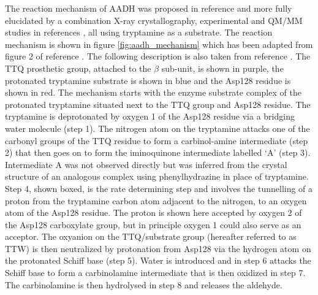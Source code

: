The reaction mechanism of AADH was proposed in reference \cite{hyunMechanisticStudiesAromatic1995a} and more fully elucidated by a combination X-ray crystallography, experimental and QM/MM studies in references \cite{masgrauAtomicDescriptionEnzyme2006,masgrauTunnelingClassicalPaths2007, ranaghanInitioQMMM2017}, all using tryptamine as a substrate. 
The reaction mechanism is shown in figure \ref{fig:aadh_mechanism} which has been adapted from figure 2 of reference \cite{masgrauAtomicDescriptionEnzyme2006}. The following description is also taken from reference \cite{masgrauAtomicDescriptionEnzyme2006}. The TTQ prosthetic group, attached to the $\beta$ sub-unit, is shown in purple, the protonated tryptamine substrate is shown in blue and the Asp128 residue is shown in red.  The mechanism starts with the enzyme substrate complex of the protonated tryptamine situated next to the TTQ group and Asp128 residue. The tryptamine is deprotonated by oxygen 1 of the Asp128 residue via a bridging water molecule (step 1). The nitrogen atom on the tryptamine attacks one of the carbonyl groups of the TTQ residue to form a carbinol-amine intermediate (step 2) that then goes on to form the iminoquinone intermediate labelled `A' (step 3). Intermediate A was not observed directly but was inferred from the crystal structure of an analogous complex using phenylhydrazine in place of tryptamine. Step 4, shown boxed, is the rate determining step and involves the tunnelling of a proton from the tryptamine carbon atom adjacent to the nitrogen, to an oxygen atom of the Asp128 residue.  The proton is shown here accepted by oxygen 2 of the Asp128 carboxylate group, but in principle oxygen 1 could also serve as an acceptor. The oxyanion on the TTQ/substrate group (hereafter referred to as TTW) is then neutralized by protonation from Asp128 via the hydrogen atom on the protonated Schiff base (step 5). Water is introduced and in step 6 attacks the Schiff base to form a carbinolamine intermediate that is then oxidized in step 7.  The carbinolamine is then hydrolysed in step 8 and releases the aldehyde.  


